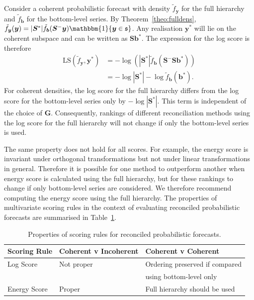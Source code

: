 \documentclass[a4paper,12pt]{article}
\theoremstyle{definition}
\begin{document}
Consider a coherent probabilistic forecast with density $\tilde{f}_{\bm{y}}$ for the full hierarchy and $\tilde{f}_{\bm{b}}$ for the bottom-level series. By Theorem~\ref{theo:fulldens}, $\tilde{f}_{\bm{y}}(\bm{y})=|\bm{S}^*|\tilde{f}_{\bm{b}}(\bm{S}^-\bm{y})\mathbbm{1}\{\bm{y}\in\mathfrak{s}\}$. Any realisation $\bm{y}^*$ will lie on the coherent subspace and can be written as $\bm{S}\bm{b}^*$. The expression for the log score is therefore
\begin{align}
\text{LS}(\tilde{f}_{\bm{y}},\bm{y}^*)&=-\log\left(|\bm{S}^*|\tilde{f}_{\bm{b}}(\bm{S}^-\bm{S}\bm{b}^*)\right)\nonumber\\
&=-\log|\bm{S}^*|-\log \tilde{f}_{\bm{b}}(\bm{b}^*).\nonumber
\end{align}
For coherent densities, the log score for the full hierarchy differs from the log score for the bottom-level series only by $-\log|\bm{S}^*|$. This term is independent of the choice of $\bm{G}$. Consequently, rankings of different reconciliation methods using the log score for the full hierarchy will not change if only the bottom-level series is used.

The same property does not hold for all scores. For example, the energy score is invariant under orthogonal transformations \citep{Szekely2013} but not under linear transformations in general. Therefore it is possible for one method to outperform another when energy score is calculated using the full hierarchy, but for these rankings to change if only bottom-level series are considered. We therefore recommend computing the energy score using the full hierarchy. The properties of multivariate scoring rules in the context of evaluating reconciled probabilistic forecasts are summarised in Table~\ref{tab:prop}.

\begin{table}[!htb]
	\caption{Properties of scoring rules for reconciled probabilistic forecasts.}\label{tab:ScoringRulesProperties}
	\centering
	\begin{tabular}{lll}\hline
		Scoring Rule& Coherent v Incoherent &Coherent v Coherent\\
		\hline
		Log Score & Not proper & Ordering preserved if compared \\ && using bottom-level only\\
		Energy Score & Proper & Full hierarchy should be used\\
		\hline
	\end{tabular}

	\label{tab:prop}
\end{table}
\end{document}
